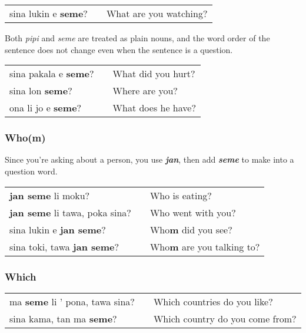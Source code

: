 \begin{supertabular}{p{5,5cm}|ll}
sina lukin e \textbf{seme}? && What are you watching? \\
\end{supertabular} 

Both \textit{pipi} and \textit{seme} are treated as plain nouns, and the word order of the sentence does not change even when the sentence is a question. 

\begin{supertabular}{p{5,5cm}|ll}
sina pakala e \textbf{seme}? && What did you hurt? \\
sina lon \textbf{seme}? && Where are you? \\ 
ona li jo e \textbf{seme}? && What does he have? \\
\end{supertabular} 
%
\subsubsection*{Who(m)}
%
Since you're asking about a person, you use \textbf{\textit{jan}}, then add \textbf{\textit{seme}} to make into a question word. 

\begin{supertabular}{p{5,5cm}|ll}
\textbf{jan seme} li moku? && Who is eating? \\
\textbf{jan seme} li tawa, poka sina? && Who went with you? \\
sina lukin e \textbf{jan seme}? && Who\textbf{m} did you see? \\
sina toki, tawa \textbf{jan seme}? && Who\textbf{m} are you talking to? \\
\end{supertabular} 
%
\subsubsection*{Which}
%
\begin{supertabular}{p{5,5cm}|ll}
ma \textbf{seme} li ' pona, tawa sina? && Which countries do you like? \\
sina kama, tan ma \textbf{seme}? && Which country do you come from? \\ 
\end{supertabular} 

